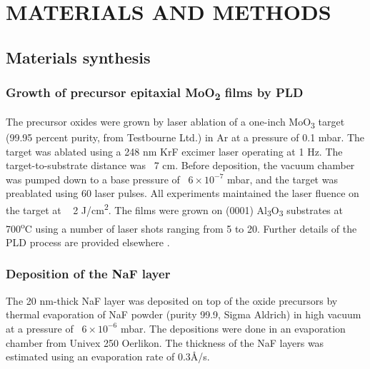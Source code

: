 \documentclass[journal=jacsnano,manuscript=article]{achemso}
\begin{document}
\section{MATERIALS AND METHODS}
\subsection{Materials synthesis}
\subsubsection{Growth of precursor epitaxial MoO\textsubscript{2} films by PLD}

The precursor oxides were grown by laser ablation of a one-inch MoO\textsubscript{3} target (99.95 percent purity, from Testbourne Ltd.) in Ar at a pressure of 0.1 mbar. The target was ablated using a 248 nm KrF excimer laser operating at 1 Hz. The target-to-substrate distance was ~7 cm. Before deposition, the vacuum chamber was pumped down to a base pressure of ~$6\times 10^{-7}$ mbar, and the target was preablated using 60 laser pulses. All experiments maintained the laser fluence on the target at ~ 2 J/cm\textsuperscript{2}. The films were grown on (0001) Al\textsubscript{3}O\textsubscript{3} substrates at 700\textsuperscript{o}C using a number of laser shots ranging from 5 to 20. Further details of the PLD process are provided elsewhere \cite{WOS:000623061800072}.

\subsubsection{Deposition of the NaF layer}
The 20 nm-thick NaF layer was deposited on top of the oxide precursors by thermal evaporation of NaF powder (purity 99.9, Sigma Aldrich) in high vacuum at a pressure of ~$6\times 10^{-6}$ mbar. The depositions were done in an evaporation chamber from Univex 250 Oerlikon. The thickness of the NaF layers was estimated using an evaporation rate of 0.3\AA/s.
\end{document}
